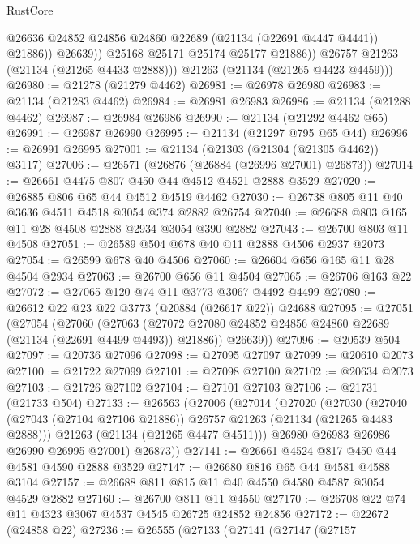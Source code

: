 \begin{lexlean}{RustCore}
\begin{coremodule}
                    @26636
                    @24852
                    @24856
                    @24860
                    @22689
                    (@21134 (@22691 @4447 @4441))
                    @21886))
                @26639))
            @25168
            @25171
            @25174
            @25177
            @21886))
        @26757
        @21263
        (@21134 (@21265 @4433 @2888)))
      @21263
      (@21134 (@21265 @4423 @4459)))
@26980 := @21278 (@21279 @4462)
@26981 := @26978 @26980
@26983 := @21134 (@21283 @4462)
@26984 := @26981 @26983
@26986 := @21134 (@21288 @4462)
@26987 := @26984 @26986
@26990 := @21134 (@21292 @4462 @65)
@26991 := @26987 @26990
@26995 := @21134 (@21297 @795 @65 @44)
@26996 := @26991 @26995
@27001 := @21134 (@21303 (@21304 (@21305 @4462)) @3117)
@27006 := @26571 (@26876 (@26884 (@26996 @27001) @26873))
@27014 := @26661 @4475 @807 @450 @44 @4512 @4521 @2888 @3529
@27020 := @26885 @806 @65 @44 @4512 @4519 @4462
@27030 := @26738 @805 @11 @40 @3636 @4511 @4518 @3054 @374 @2882 @26754
@27040 := @26688 @803 @165 @11 @28 @4508 @2888 @2934 @3054 @390 @2882
@27043 := @26700 @803 @11 @4508
@27051 := @26589 @504 @678 @40 @11 @2888 @4506 @2937 @2073
@27054 := @26599 @678 @40 @4506
@27060 := @26604 @656 @165 @11 @28 @4504 @2934
@27063 := @26700 @656 @11 @4504
@27065 := @26706 @163 @22
@27072 := @27065 @120 @74 @11 @3773 @3067 @4492 @4499
@27080 := @26612 @22 @23 @22 @3773 (@20884 (@26617 @22)) @24688
@27095 := @27051
    (@27054
      (@27060
        (@27063 (@27072 @27080 @24852 @24856 @24860 @22689 (@21134 (@22691 @4499 @4493)) @21886))
        @26639))
@27096 := @20539 @504
@27097 := @20736 @27096
@27098 := @27095 @27097
@27099 := @20610 @2073
@27100 := @21722 @27099
@27101 := @27098 @27100
@27102 := @20634 @2073
@27103 := @21726 @27102
@27104 := @27101 @27103
@27106 := @21731 (@21733 @504)
@27133 := @26563
    (@27006
      (@27014
        (@27020
          (@27030
            (@27040 (@27043 (@27104 @27106 @21886)) @26757 @21263 (@21134 (@21265 @4483 @2888)))
            @21263
            (@21134 (@21265 @4477 @4511)))
          @26980
          @26983
          @26986
          @26990
          @26995
          @27001)
        @26873))
@27141 := @26661 @4524 @817 @450 @44 @4581 @4590 @2888 @3529
@27147 := @26680 @816 @65 @44 @4581 @4588 @3104
@27157 := @26688 @811 @815 @11 @40 @4550 @4580 @4587 @3054 @4529 @2882
@27160 := @26700 @811 @11 @4550
@27170 := @26708 @22 @74 @11 @4323 @3067 @4537 @4545 @26725 @24852 @24856
@27172 := @22672 (@24858 @22)
@27236 := @26555
    (@27133
      (@27141
        (@27147
          (@27157

\end{coremodule}
\end{lexlean}
